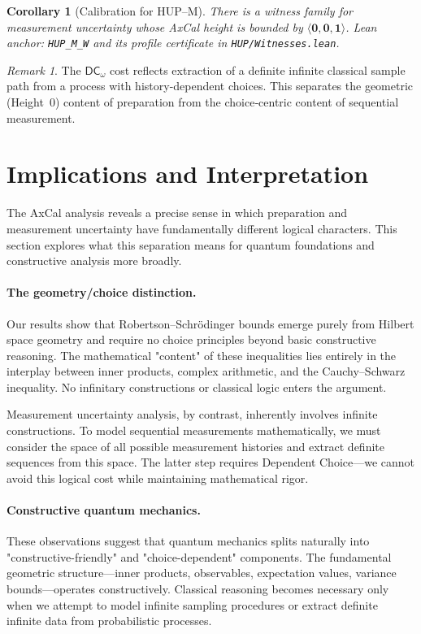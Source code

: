 \documentclass[11pt]{article}
\newcommand{\DCw}{\mathsf{DC}_{\omega}}
\newcommand{\hzero}{\mathbf{0}}
\newcommand{\hone}{\mathbf{1}}
\newcommand{\DCwonly}{\langle \hzero,\hzero,\hone\rangle}
\newcommand{\lean}[1]{\texttt{#1}}
\newcommand{\leanok}{\text{\tiny [✓ Lean Verified]}}
\theoremstyle{plain}
\newtheorem{corollary}[theorem]{Corollary}
\theoremstyle{definition}
\theoremstyle{remark}
\newtheorem{remark}[theorem]{Remark}
\begin{document}
\begin{corollary}[Calibration for HUP--M]\leanok
\label{cor:HUPM}
There is a witness family for measurement uncertainty whose AxCal height is bounded by $\DCwonly$.
\emph{Lean anchor:} \lean{HUP\_M\_W} and its profile certificate in \texttt{HUP/Witnesses.lean}.
\end{corollary}

\begin{remark}
The $\DCw$ cost reflects extraction of a definite infinite classical sample path from a process with history-dependent choices.
This separates the geometric (Height~0) content of preparation from the choice‑centric content of sequential measurement.
\end{remark}

\section{Implications and Interpretation}
\label{sec:implications}

The AxCal analysis reveals a precise sense in which preparation and measurement uncertainty have fundamentally different logical characters. This section explores what this separation means for quantum foundations and constructive analysis more broadly.

\paragraph{The geometry/choice distinction.}
Our results show that Robertson--Schrödinger bounds emerge purely from Hilbert space geometry and require no choice principles beyond basic constructive reasoning. The mathematical "content" of these inequalities lies entirely in the interplay between inner products, complex arithmetic, and the Cauchy--Schwarz inequality. No infinitary constructions or classical logic enters the argument.

Measurement uncertainty analysis, by contrast, inherently involves infinite constructions. To model sequential measurements mathematically, we must consider the space of all possible measurement histories and extract definite sequences from this space. The latter step requires Dependent Choice---we cannot avoid this logical cost while maintaining mathematical rigor.

\paragraph{Constructive quantum mechanics.}
These observations suggest that quantum mechanics splits naturally into "constructive-friendly" and "choice-dependent" components. The fundamental geometric structure---inner products, observables, expectation values, variance bounds---operates constructively. Classical reasoning becomes necessary only when we attempt to model infinite sampling procedures or extract definite infinite data from probabilistic processes.
\end{document}
